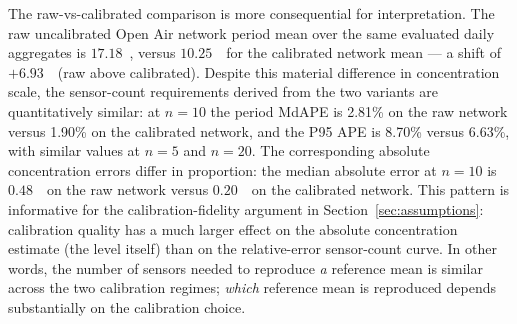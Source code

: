 The raw-vs-calibrated comparison is more consequential for interpretation. The raw uncalibrated Open Air network period mean over the same evaluated daily aggregates is $17.18$~\units, versus $10.25$~\units\ for the calibrated network mean --- a shift of $+6.93$~\units\ (raw above calibrated). Despite this material difference in concentration scale, the sensor-count requirements derived from the two variants are quantitatively similar: at $n=10$ the period MdAPE is 2.81\% on the raw network versus 1.90\% on the calibrated network, and the P95 APE is 8.70\% versus 6.63\%, with similar values at $n=5$ and $n=20$. The corresponding absolute concentration errors differ in proportion: the median absolute error at $n=10$ is $0.48$~\units\ on the raw network versus $0.20$~\units\ on the calibrated network. This pattern is informative for the calibration-fidelity argument in Section~\ref{sec:assumptions}: calibration quality has a much larger effect on the absolute concentration estimate (the level itself) than on the relative-error sensor-count curve. In other words, the number of sensors needed to reproduce \emph{a} reference mean is similar across the two calibration regimes; \emph{which} reference mean is reproduced depends substantially on the calibration choice.
